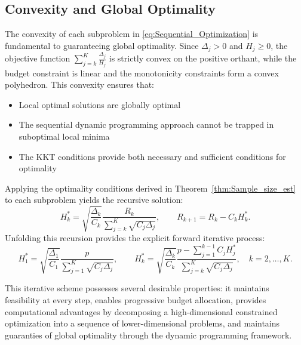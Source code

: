 \subsection{Convexity and Global Optimality}

The convexity of each subproblem in \eqref{eq:Sequential_Optimization} is fundamental to guaranteeing global optimality. Since $\Delta_j > 0$ and $H_j\ge 0$, the objective function $\sum_{j=k}^K \frac{\Delta_j}{H_j}$ is strictly convex on the positive orthant, while the budget constraint is linear and the monotonicity constraints form a convex polyhedron. This convexity ensures that:
\begin{itemize}
    \item Local optimal solutions are globally optimal
    \item The sequential dynamic programming approach cannot be trapped in suboptimal local minima
    \item The KKT conditions provide both necessary and sufficient conditions for optimality
\end{itemize}


Applying the optimality conditions derived in Theorem~\ref{thm:Sample_size_est} to each subproblem yields the recursive solution:
\begin{equation*}
    H_k^* = \sqrt{\frac{\Delta_k}{C_k}} \frac{R_k}{\sum_{j=k}^K\sqrt{C_j\Delta_j}},
    \qquad 
    R_{k+1} = R_k - C_k H_k^*.
\end{equation*}
Unfolding this recursion provides the explicit forward iterative process:
\begin{equation}\label{eq:MFMC_New_RealValued_Sample_Size}
    H_1^* = \sqrt{\frac{\Delta_1}{C_1}} \frac{p}{\sum_{j=1}^K\sqrt{C_j\Delta_j}}, 
    \qquad 
    H_k^* = \sqrt{\frac{\Delta_k}{C_k}} \frac{p-\sum_{j=1}^{k-1}C_jH_j^*}{\sum_{j=k}^K\sqrt{C_j\Delta_j}}, 
    \quad k = 2,\ldots, K.
\end{equation}


This iterative scheme possesses several desirable properties: it maintains feasibility at every step, enables progressive budget allocation, provides computational advantages by decomposing a high-dimensional constrained optimization into a sequence of lower-dimensional problems, and maintains guaranties of global optimality through the dynamic programming framework.

